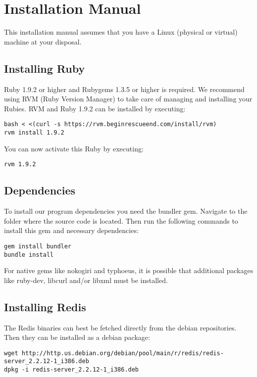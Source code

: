 \chapter{Installation Manual}

This installation manual assumes that you have a Linux (physical or virtual) machine at your disposal.

\section{Installing Ruby}

Ruby 1.9.2 or higher and Rubygems 1.3.5 or higher is required. We recommend using RVM (Ruby Version Manager) to take care of managing and installing your Rubies. RVM and Ruby 1.9.2 can be installed by executing:

\begin{verbatim}
bash < <(curl -s https://rvm.beginrescueend.com/install/rvm)
rvm install 1.9.2
\end{verbatim}

You can now activate this Ruby by executing:

\begin{verbatim}
rvm 1.9.2
\end{verbatim}

\section{Dependencies}

To install our program dependencies you need the bundler gem. Navigate to the folder where the source code is located. Then run the following commands to install this gem and necessary dependencies:

\begin{verbatim}
gem install bundler
bundle install
\end{verbatim}

For native gems like nokogiri and typhoeus, it is possible that additional packages like ruby-dev, libcurl and/or libxml must be installed.

\section{Installing Redis}

The Redis binaries can best be fetched directly from the debian repositories. Then they can be installed as a debian package:

\begin{verbatim}
wget http://http.us.debian.org/debian/pool/main/r/redis/redis-server_2.2.12-1_i386.deb
dpkg -i redis-server_2.2.12-1_i386.deb
\end{verbatim}

